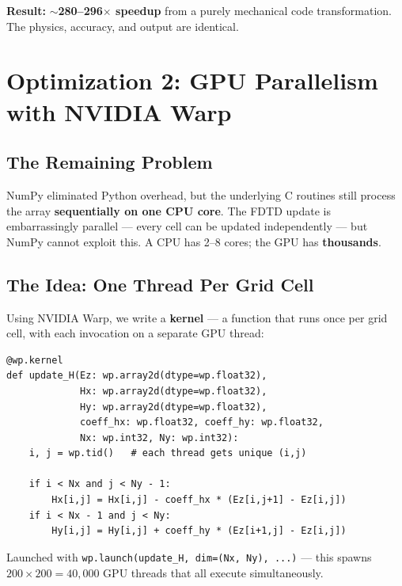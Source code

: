 \documentclass[11pt,a4paper]{article}
\begin{document}
\noindent\textbf{Result:} $\sim$\textbf{280--296$\times$ speedup} from a purely mechanical code transformation. The physics, accuracy, and output are identical.


\section{Optimization 2: GPU Parallelism with NVIDIA Warp}
\label{sec:gpu}

\subsection{The Remaining Problem}

\begin{tcolorbox}[colback=red!3, colframe=warnred, title=\textbf{Bottleneck \#2: Single-core sequential execution}]
NumPy eliminated Python overhead, but the underlying C routines still process the array \textbf{sequentially on one CPU core}. The FDTD update is embarrassingly parallel --- every cell can be updated independently --- but NumPy cannot exploit this. A CPU has 2--8 cores; the GPU has \textbf{thousands}.
\end{tcolorbox}

\subsection{The Idea: One Thread Per Grid Cell}

Using NVIDIA Warp, we write a \textbf{kernel} --- a function that runs once per grid cell, with each invocation on a separate GPU thread:

\begin{lstlisting}[caption={H-field update --- Warp GPU kernel}]
@wp.kernel
def update_H(Ez: wp.array2d(dtype=wp.float32),
             Hx: wp.array2d(dtype=wp.float32),
             Hy: wp.array2d(dtype=wp.float32),
             coeff_hx: wp.float32, coeff_hy: wp.float32,
             Nx: wp.int32, Ny: wp.int32):
    i, j = wp.tid()   # each thread gets unique (i,j)

    if i < Nx and j < Ny - 1:
        Hx[i,j] = Hx[i,j] - coeff_hx * (Ez[i,j+1] - Ez[i,j])
    if i < Nx - 1 and j < Ny:
        Hy[i,j] = Hy[i,j] + coeff_hy * (Ez[i+1,j] - Ez[i,j])
\end{lstlisting}

Launched with \texttt{wp.launch(update\_H, dim=(Nx, Ny), ...)} --- this spawns $200 \times 200 = 40{,}000$ GPU threads that all execute simultaneously.
\end{document}
